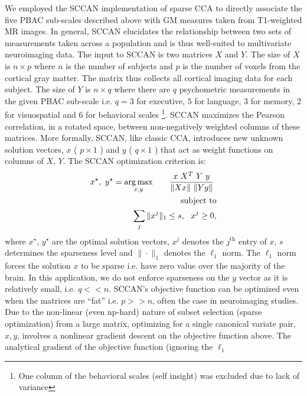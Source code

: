 \documentclass[preprint,authoryear,12pt]{elsarticle}
\begin{document}
We employed the SCCAN implementation of sparse CCA to directly associate the five PBAC sub-scales described above with GM measures taken from T1-weighted MR images.   In general, SCCAN elucidates the relationship between two sets of measurements taken across a population and is thus well-suited to multivariate neuroimaging data.  The input to SCCAN is two matrices $X$ and $Y$.  The size of $X$ is $n \times p$ where $n$ is the number of subjects and $p$ is the number of voxels from the cortical gray matter.  The matrix thus collects all cortical imaging data for each subject.  The size of $Y$ is $n \times q$ where there are $q$ psychometric measurements in the given PBAC sub-scale i.e. $q=3$ for executive, $5$ for language, $3$ for memory, $2$ for visuospatial and $6$ for behavioral scales \footnote{One column of the behavioral scales (self insight) was excluded due to lack of variance}.  SCCAN maximizes the Pearson correlation, in a rotated space, between non-negatively weighted columns of these matrices.   More formally, SCCAN,  like classic CCA, introduces new unknown solution vectors, $x$ ( $p \times 1$ ) and $y$ ( $q \times 1$ ) that act as weight functions on columns of $X$, $Y$.   The SCCAN optimization criterion is: 
%
%
\begin{eqnarray} 
\label{eq:cca}
 x^\star,~y^\star  =
\underset{x,y}{\operatorname{arg\,max}} \quad~
 ~~\frac{x~X^T ~Y~y}{\| X x \|~\| Y y \|}~\\ \notag \text{subject to} \\ \notag \sum_j
\|x^j\|_1 \leq s,~~ x^j \ge 0,
\end{eqnarray} where $x^\star$, $y^\star$ are the optimal solution vectors, $x^j$ denotes the $j^\text{th}$ entry of $x$, $s$ determines the sparseness level and $\|\cdot\|_1$ denotes the $\ell_1$ norm. The $\ell_1$ norm forces the solution $x$ to be sparse i.e. have zero value over the majority of the brain.  In this application, we do not enforce sparseness on the $y$ vector as it is relatively small, i.e. $q << n$.  SCCAN's objective function can be optimized even when the matrices are “fat” i.e. $p >> n$, often the case in neuroimaging studies.  Due to the non-linear (even np-hard) nature of subset selection (sparse optimization) from a large matrix, optimizing for a single canonical variate pair, $x, y$, involves a nonlinear gradient descent on the objective function above. 
The analytical gradient of the objective function (ignoring the $\ell_1$
\end{document}
